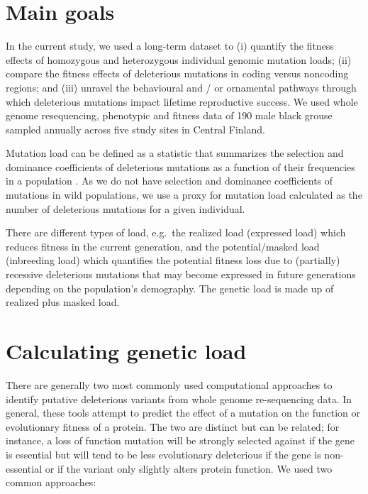 \documentclass[
  letterpaper,
  DIV=11,
  numbers=noendperiod]{scrreprt}
\begin{document}

\hypertarget{main-goals}{%
\chapter{Main goals}\label{main-goals}}

In the current study, we used a long-term dataset to (i) quantify the
fitness effects of homozygous and heterozygous individual genomic
mutation loads; (ii) compare the fitness effects of deleterious
mutations in coding versus noncoding regions; and (iii) unravel the
behavioural and / or ornamental pathways through which deleterious
mutations impact lifetime reproductive success. We used whole genome
resequencing, phenotypic and fitness data of 190 male black grouse
sampled annually across five study sites in Central Finland.

Mutation load can be defined as a statistic that summarizes the
selection and dominance coefficients of deleterious mutations as a
function of their frequencies in a population
\autocite{bertorelleGeneticLoadGenomic2022}. As we do not have selection
and dominance coefficients of mutations in wild populations, we use a
proxy for mutation load calculated as the number of deleterious
mutations for a given individual.

There are different types of load, e.g.~the realized load (expressed
load) which reduces fitness in the current generation, and the
potential/masked load (inbreeding load) which quantifies the potential
fitness loss due to (partially) recessive deleterious mutations that may
become expressed in future generations depending on the population's
demography. The genetic load is made up of realized plus masked load.


\hypertarget{calculating-genetic-load}{%
\chapter{Calculating genetic load}\label{calculating-genetic-load}}

There are generally two most commonly used computational approaches to
identify putative deleterious variants from whole genome re-sequencing
data. In general, these tools attempt to predict the effect of a
mutation on the function or evolutionary fitness of a protein. The two
are distinct but can be related; for instance, a loss of function
mutation will be strongly selected against if the gene is essential but
will tend to be less evolutionary deleterious if the gene is
non-essential or if the variant only slightly alters protein function.
We used two common approaches:
\end{document}
